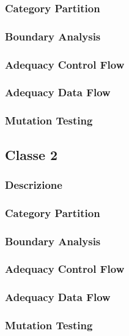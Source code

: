 \documentclass[12pt, a4paper]{article}
\begin{document}
\subsubsection{Category Partition}
\subsubsection{Boundary Analysis}
\subsubsection{Adequacy Control Flow}
\subsubsection{Adequacy Data Flow}
\subsubsection{Mutation Testing}

\subsection{Classe 2}
\subsubsection{Descrizione}
\subsubsection{Category Partition}
\subsubsection{Boundary Analysis}
\subsubsection{Adequacy Control Flow}
\subsubsection{Adequacy Data Flow}
\subsubsection{Mutation Testing}
\end{document}
